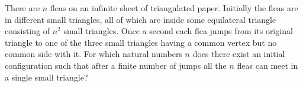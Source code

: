 There are $n$ fleas on an infinite sheet of triangulated paper. Initially the fleas are in different small triangles, all of which are inside some equilateral triangle consisting of $n^2$ small triangles. Once a second each flea jumps from its original triangle to one of the three small triangles having a common vertex but no common side with it. For which natural numbers $n$ does there exist an initial configuration such that after a finite number of jumps all the $n$ fleas can meet in a single small triangle?